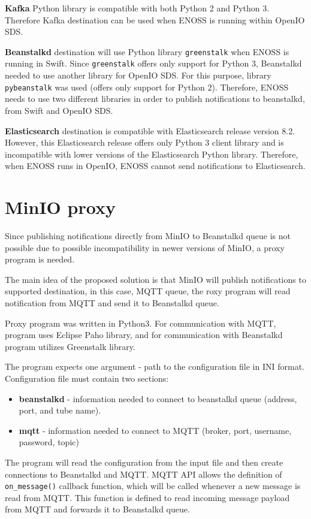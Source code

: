     \textbf{Kafka} Python library is compatible with both Python 2 and Python 3. Therefore Kafka destination can be used when ENOSS is running within OpenIO SDS.

    \textbf{Beanstalkd} destination will use Python library \texttt{greenstalk} when ENOSS is running in Swift. Since \texttt{greenstalk} offers only support for Python 3, Beanstalkd needed to use another library for OpenIO SDS. For this purpose, library \texttt{pybeanstalk} was used (offers only support for Python 2). Therefore, ENOSS needs to use two different libraries in order to publish notifications to beanstalkd, from Swift and OpenIO SDS.

    \textbf{Elasticsearch} destination is compatible with Elasticsearch release version 8.2. However, this Elasticsearch release offers only Python 3 client library and is incompatible with lower versions of the Elasticsearch Python library. Therefore, when ENOSS runs in OpenIO, ENOSS cannot send notifications to Elasticsearch.

\section{MinIO proxy}
    Since publishing notifications directly from MinIO to Beanstalkd queue is not possible due to possible incompatibility in newer versions of MinIO, a proxy program is needed.

    The main idea of the proposed solution is that MinIO will publish notifications to supported destination, in this case, MQTT queue, the roxy program will read notification from MQTT and send it to Beanstalkd queue.

    Proxy program was written in Python3. For communication with MQTT, program uses Eclipse Paho library, and for communication with Beanstalkd program utilizes Greenstalk library.

    The program expects one argument - path to the configuration file in INI format. Configuration file must contain two sections:
    \begin{itemize}
        \item \textbf{beanstalkd} - information needed to connect to beanstalkd queue (address, port, and tube name).
        \item \textbf{mqtt} - information needed to connect to MQTT (broker, port, username, password, topic)
    \end{itemize}

    The program will read the configuration from the input file and then create connections to Beanstalkd and MQTT. MQTT API allows the definition of \texttt{on\_message()} callback function, which will be called whenever a new message is read from MQTT. This function is defined to read incoming message payload from MQTT and forwards it to Beanstalkd queue.

